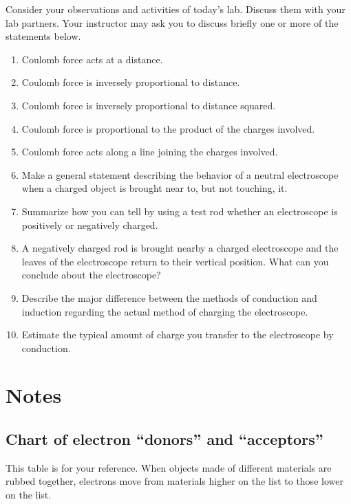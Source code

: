 Consider your observations and activities of today's lab. Discuss them with your lab partners. Your instructor may ask you to discuss briefly one or more of the statements below.
\begin{enumerate}
	\item Coulomb force acts at a distance.
	\item Coulomb force is inversely proportional to distance.
	\item Coulomb force is inversely proportional to distance squared.
	\item Coulomb force is proportional to the product of the charges involved.
	\item Coulomb force acts along a line joining the charges involved.
	\item Make a general statement describing the behavior of a neutral electroscope when a charged object is brought near to, but not touching, it.
	\item Summarize how you can tell by using a test rod whether an electroscope is positively or negatively charged.
	\item A negatively charged rod is brought nearby a charged electroscope and the leaves of the 
electroscope return to their vertical position.  What can you conclude about the electroscope? 
	\item Describe the major difference between the methods of conduction and induction regarding the actual method of charging the electroscope.
	\item Estimate the typical amount of charge you transfer to the electroscope by conduction.
\end{enumerate}

\newpage
\section*{Notes}
\subsection*{Chart of electron ``donors'' and ``acceptors''}
This table is for your reference. When objects made of different materials are rubbed together, electrons move from materials higher on the list to those lower on the list.


